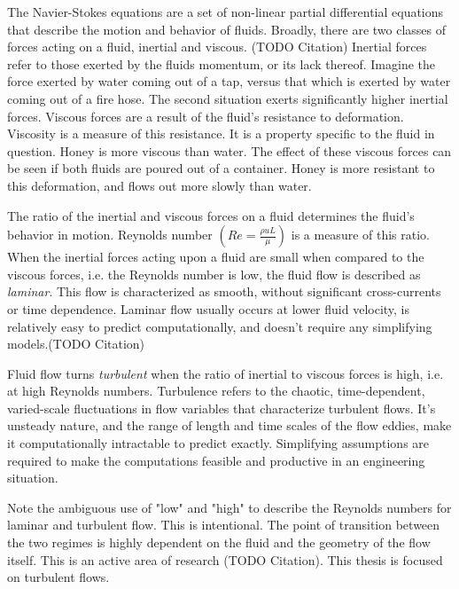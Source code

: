The Navier-Stokes equations are a set of non-linear partial differential equations that describe the motion and behavior of fluids. Broadly, there are two classes of forces acting on a fluid, inertial and viscous. (TODO Citation) Inertial forces refer to those exerted by the fluids momentum, or its lack thereof. Imagine the force exerted by water coming out of a tap, versus that which is exerted by water coming out of a fire hose. The second situation exerts significantly higher inertial forces. Viscous forces are a result of the fluid's resistance to deformation. Viscosity is a measure of this resistance. It is a property specific to the fluid in question. Honey is more viscous than water. The effect of these viscous forces can be seen if both fluids are poured out of a container. Honey is more resistant to this deformation, and flows out more slowly than water.

The ratio of the inertial and viscous forces on a fluid determines the fluid's behavior in motion. Reynolds number $\left ( Re = \frac{\rho u L}{\mu}\right )$ is a measure of this ratio. When the inertial forces acting upon a fluid are small when compared to the viscous forces, i.e. the Reynolds number is low, the fluid flow is described as \textit{laminar}. This flow is characterized as smooth, without significant cross-currents or time dependence. Laminar flow usually occurs at lower fluid velocity, is relatively easy to predict computationally, and doesn't require any simplifying models.(TODO Citation) 

Fluid flow turns \textit{turbulent} when the ratio of inertial to viscous forces is high, i.e. at high Reynolds numbers. Turbulence refers to the chaotic, time-dependent, varied-scale fluctuations in flow variables that characterize turbulent flows. It's unsteady nature, and the range of length and time scales of the flow eddies, make it computationally intractable to predict exactly. Simplifying assumptions are required to make the computations feasible and productive in an engineering situation. 

Note the ambiguous use of "low" and "high" to describe the Reynolds numbers for laminar and turbulent flow. This is intentional. The point of transition between the two regimes is highly dependent on the fluid and the geometry of the flow itself. This is an active area of research (TODO Citation). This thesis is focused on turbulent flows. 